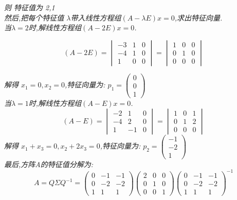 \documentclass{scrartcl}
\numberwithin{equation}{section}
\begin{document}
\textsl{则 特征值为  2,1  \\然后,把每个特征值 $\lambda$带入线性方程组$(A-\lambda E)x =0 $,求出特征向量.
    \\当$\lambda=2$时,解线性方程组$(A-2 E)x =0 $.}


\[
    (A-2E)=\begin{vmatrix} -3& 1& 0\\ -4 & 1& 0\\ 1 & 0 & 0 \end{vmatrix}=\begin{vmatrix} 1& 0& 0\\ 0 & 1& 0\\ 0 & 0 & 0 \end{vmatrix}
\]

\textsl{
    解得 $x_1 =0,x_2 =0$,特征向量为:
    $p_1 = \begin{pmatrix} 0\\0\\1 \end{pmatrix}$
    \\ 当$\lambda=1$时,解线性方程组$(A-E)x =0 $.
}
\[
    (A-E)=\begin{vmatrix} -2& 1& 0\\ -4 & 2& 0\\ 1 &  -1& 0 \end{vmatrix}=\begin{vmatrix} 1& 0& 1\\ 0 & 1& 2\\ 0 & 0 & 0 \end{vmatrix}
\]
\textsl{
    解得 $x_1 + x_3=0,x_2 + 2x_3=0$,特征向量为:
    $p_2 = \begin{pmatrix} -1\\-2\\1 \end{pmatrix}$
    \\ 最后,方阵A的特征值分解为:
}
\[
    A=Q  \Sigma Q^{-1} = \begin{pmatrix} 0& -1& -1\\ 0 & -2& -2\\ 1 &  1& 1 \end{pmatrix}
    \begin{pmatrix} 2& 0& 0\\ 0 & 1& 0\\ 0 &  0& 1 \end{pmatrix}
    \mathrm{\begin{pmatrix} 0& -1& -1\\ 0 & -2& -2\\ 1 &  1& 1 \end{pmatrix}}^{-1}
\]
\end{document}

